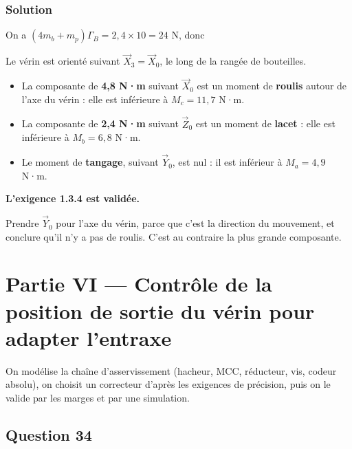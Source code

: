 \documentclass[11pt,a4paper]{article}
\providecommand{\tightlist}{\setlength{\itemsep}{0pt}\setlength{\parskip}{0pt}}
\newcommand{\equationajustee}[1]{%
  \sbox{\boiteequation}{$\displaystyle #1$}%
  \ifdim\wd\boiteequation>\linewidth
    \[\resizebox{\linewidth}{!}{\usebox{\boiteequation}}\]%
  \else
    \[#1\]%
  \fi}
\begin{document}
\hypertarget{solution-32}{%
\subsubsection{Solution}\label{solution-32}}

On a \((4m_b+m_p)\Gamma_B=2{,}4\times10=24\) N, donc

\equationajustee{\vec\delta_B(E/0)=-4{,}8\,\vec X_0-2{,}4\,\vec Z_0\quad(\text{N·m})}

Le vérin est orienté suivant \(\vec X_3=\vec X_0\), le long de la rangée de bouteilles.

\begin{itemize}
\tightlist
\item
  La composante de \textbf{4,8 N·m} suivant \(\vec X_0\) est un moment de \textbf{roulis} autour de l'axe du vérin : elle est inférieure à \(M_c=11{,}7\) N·m.
\item
  La composante de \textbf{2,4 N·m} suivant \(\vec Z_0\) est un moment de \textbf{lacet} : elle est inférieure à \(M_b=6{,}8\) N·m.
\item
  Le moment de \textbf{tangage}, suivant \(\vec Y_0\), est nul : il est inférieur à \(M_a=4{,}9\) N·m.
\end{itemize}

\textbf{L'exigence 1.3.4 est validée.}

\begin{piege}

Prendre \(\vec Y_0\) pour l'axe du vérin, parce que c'est la direction du mouvement, et conclure qu'il n'y a pas de roulis. C'est au contraire la plus grande composante.

\end{piege}

\hypertarget{partie-vi-contruxf4le-de-la-position-de-sortie-du-vuxe9rin-pour-adapter-lentraxe}{%
\section{Partie VI --- Contrôle de la position de sortie du vérin pour adapter l'entraxe}\label{partie-vi-contruxf4le-de-la-position-de-sortie-du-vuxe9rin-pour-adapter-lentraxe}}

On modélise la chaîne d'asservissement (hacheur, MCC, réducteur, vis, codeur absolu), on choisit un correcteur d'après les exigences de précision, puis on le valide par les marges et par une simulation.

\hypertarget{question-34}{%
\subsection{Question 34}\label{question-34}}
\end{document}
